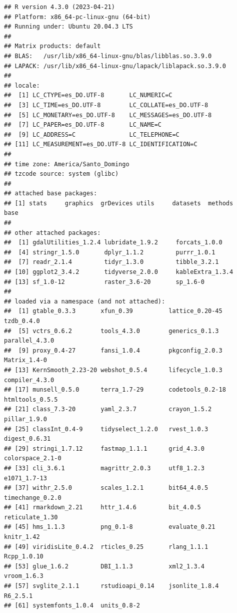 \documentclass[spanish]{article}
\begin{document}
\begin{verbatim}
## R version 4.3.0 (2023-04-21)
## Platform: x86_64-pc-linux-gnu (64-bit)
## Running under: Ubuntu 20.04.3 LTS
## 
## Matrix products: default
## BLAS:   /usr/lib/x86_64-linux-gnu/blas/libblas.so.3.9.0 
## LAPACK: /usr/lib/x86_64-linux-gnu/lapack/liblapack.so.3.9.0
## 
## locale:
##  [1] LC_CTYPE=es_DO.UTF-8       LC_NUMERIC=C              
##  [3] LC_TIME=es_DO.UTF-8        LC_COLLATE=es_DO.UTF-8    
##  [5] LC_MONETARY=es_DO.UTF-8    LC_MESSAGES=es_DO.UTF-8   
##  [7] LC_PAPER=es_DO.UTF-8       LC_NAME=C                 
##  [9] LC_ADDRESS=C               LC_TELEPHONE=C            
## [11] LC_MEASUREMENT=es_DO.UTF-8 LC_IDENTIFICATION=C       
## 
## time zone: America/Santo_Domingo
## tzcode source: system (glibc)
## 
## attached base packages:
## [1] stats     graphics  grDevices utils     datasets  methods   base     
## 
## other attached packages:
##  [1] gdalUtilities_1.2.4 lubridate_1.9.2     forcats_1.0.0      
##  [4] stringr_1.5.0       dplyr_1.1.2         purrr_1.0.1        
##  [7] readr_2.1.4         tidyr_1.3.0         tibble_3.2.1       
## [10] ggplot2_3.4.2       tidyverse_2.0.0     kableExtra_1.3.4   
## [13] sf_1.0-12           raster_3.6-20       sp_1.6-0           
## 
## loaded via a namespace (and not attached):
##  [1] gtable_0.3.3       xfun_0.39          lattice_0.20-45    tzdb_0.4.0        
##  [5] vctrs_0.6.2        tools_4.3.0        generics_0.1.3     parallel_4.3.0    
##  [9] proxy_0.4-27       fansi_1.0.4        pkgconfig_2.0.3    Matrix_1.4-0      
## [13] KernSmooth_2.23-20 webshot_0.5.4      lifecycle_1.0.3    compiler_4.3.0    
## [17] munsell_0.5.0      terra_1.7-29       codetools_0.2-18   htmltools_0.5.5   
## [21] class_7.3-20       yaml_2.3.7         crayon_1.5.2       pillar_1.9.0      
## [25] classInt_0.4-9     tidyselect_1.2.0   rvest_1.0.3        digest_0.6.31     
## [29] stringi_1.7.12     fastmap_1.1.1      grid_4.3.0         colorspace_2.1-0  
## [33] cli_3.6.1          magrittr_2.0.3     utf8_1.2.3         e1071_1.7-13      
## [37] withr_2.5.0        scales_1.2.1       bit64_4.0.5        timechange_0.2.0  
## [41] rmarkdown_2.21     httr_1.4.6         bit_4.0.5          reticulate_1.30   
## [45] hms_1.1.3          png_0.1-8          evaluate_0.21      knitr_1.42        
## [49] viridisLite_0.4.2  rticles_0.25       rlang_1.1.1        Rcpp_1.0.10       
## [53] glue_1.6.2         DBI_1.1.3          xml2_1.3.4         vroom_1.6.3       
## [57] svglite_2.1.1      rstudioapi_0.14    jsonlite_1.8.4     R6_2.5.1          
## [61] systemfonts_1.0.4  units_0.8-2
\end{verbatim}
\end{document}
